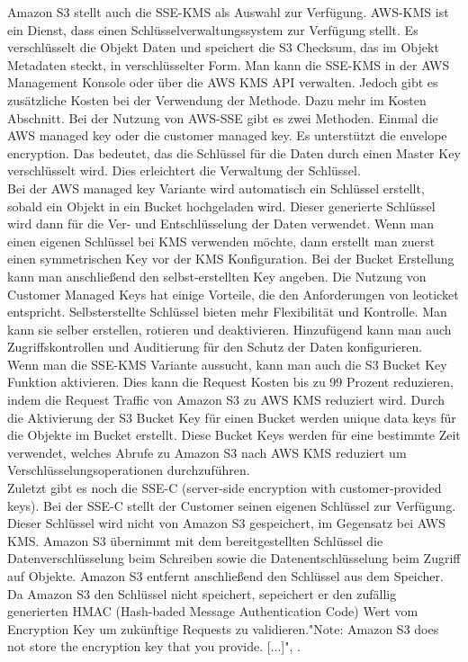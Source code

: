 Amazon S3 stellt auch die SSE-KMS als Auswahl zur Verfügung. AWS-KMS ist ein Dienst, dass einen Schlüsselverwaltungssystem zur Verfügung stellt. Es verschlüsselt die Objekt Daten und speichert die S3 Checksum, das im Objekt Metadaten steckt, in verschlüsselter Form. Man kann die SSE-KMS in der AWS Management Konsole oder über die AWS KMS API verwalten. Jedoch gibt es zusätzliche Kosten bei der Verwendung der Methode. Dazu mehr im Kosten Abschnitt. Bei der Nutzung von AWS-SSE gibt es zwei Methoden. Einmal die AWS managed key oder die customer managed key. Es unterstützt die \glqq envelope encryption\grqq. Das bedeutet, das die Schlüssel für die Daten durch einen Master Key verschlüsselt wird. Dies erleichtert die Verwaltung der Schlüssel.\\

Bei der AWS managed key Variante wird automatisch ein Schlüssel erstellt, sobald ein Objekt in ein Bucket hochgeladen wird. Dieser generierte Schlüssel wird dann für die Ver- und Entschlüsselung der Daten verwendet. Wenn man einen eigenen Schlüssel bei KMS verwenden möchte, dann erstellt man zuerst einen symmetrischen Key vor der KMS Konfiguration. Bei der Bucket Erstellung kann man anschließend den selbst-erstellten Key angeben. Die Nutzung von Customer Managed Keys hat einige Vorteile, die den Anforderungen von leoticket entspricht. Selbsterstellte Schlüssel bieten mehr Flexibilität und Kontrolle. Man kann sie selber erstellen, rotieren und deaktivieren. Hinzufügend kann man auch Zugriffskontrollen und Auditierung für den Schutz der Daten konfigurieren.\\

Wenn man die SSE-KMS Variante aussucht, kann man auch die S3 Bucket Key Funktion aktivieren. Dies kann die Request Kosten bis zu 99 Prozent reduzieren, indem die Request Traffic von Amazon S3 zu AWS KMS reduziert wird. Durch die Aktivierung der S3 Bucket Key für einen Bucket werden unique data keys für die Objekte im Bucket erstellt. Diese Bucket Keys werden für eine bestimmte Zeit verwendet, welches Abrufe zu Amazon S3 nach AWS KMS reduziert um Verschlüsselungsoperationen durchzuführen.\\

Zuletzt gibt es noch die SSE-C (server-side encryption with customer-provided keys). Bei der SSE-C stellt der Customer seinen eigenen Schlüssel zur Verfügung. Dieser Schlüssel wird nicht von Amazon S3 gespeichert, im Gegensatz bei AWS KMS. Amazon S3 übernimmt mit dem bereitgestellten Schlüssel die Datenverschlüsselung beim Schreiben sowie die Datenentschlüsselung beim Zugriff auf Objekte. Amazon S3 entfernt anschließend den Schlüssel aus dem Speicher. Da Amazon S3 den Schlüssel nicht speichert, sepeichert er den zufällig generierten HMAC (Hash-baded Message Authentication Code) Wert vom Encryption Key um zukünftige Requests zu validieren."Note: Amazon S3 does not store the encryption key that you provide. [...]", \cite{aws-sse-c}.\\

